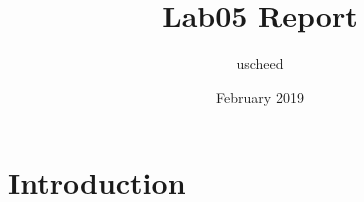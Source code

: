 \documentclass{article}
\title{Lab05 Report}
\author{uscheed }
\date{February 2019}
\begin{document}
\maketitle

\section{Introduction}

%
\end{document}
